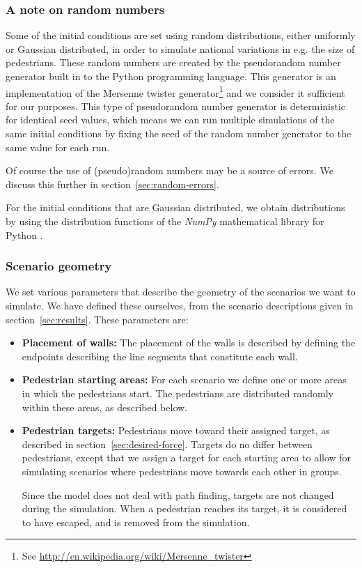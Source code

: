 \subsubsection{A note on random numbers}
Some of the initial conditions are set using random distributions, either 
uniformly or Gaussian distributed, in order to simulate national variations in 
e.g. the size of pedestrians.  These random numbers are created by the 
pseudorandom number generator built in to the Python programming language.  
This generator is an implementation of the Mersenne twister 
generator\footnote{See \url{http://en.wikipedia.org/wiki/Mersenne\_twister}} 
and we consider it sufficient for our purposes. This type of pseudorandom 
number generator is deterministic for identical seed values, which means we 
can run multiple simulations of the same initial conditions by fixing the seed 
of the random number generator to the same value for each run.

Of course the use of (pseudo)random numbers may be a source of errors. We 
discuss this further in section~\ref{sec:random-errors}.

For the initial conditions that are Gaussian distributed, we obtain 
distributions by using the distribution functions of the \emph{NumPy} 
mathematical library for Python \cite{numpy}.

\subsubsection{Scenario geometry}
We set various parameters that describe the geometry of the scenarios we want 
to simulate. We have defined these ourselves, from the scenario descriptions 
given in section~\ref{sec:results}. These parameters are:

\begin{itemize}
    \item \textbf{Placement of walls:} The placement of the walls is described 
        by defining the endpoints describing the line segments that 
        constitute each wall.

    \item \textbf{Pedestrian starting areas:} For each scenario we define one 
        or more areas in which the pedestrians start. The pedestrians are 
        distributed randomly within these areas, as described below.

    \item \textbf{Pedestrian targets:}  Pedestrians move toward their 
        assigned target, as described in section~\ref{sec:desired-force}. 
        Targets do no differ between pedestrians, except that we assign a 
        target for each starting area to allow for simulating scenarios where 
        pedestrians move towards each other in groups.

        Since the model does not deal with path finding, targets are not 
        changed during the simulation. When a pedestrian reaches its target, 
        it is considered to have escaped, and is removed from the simulation.
\end{itemize}


